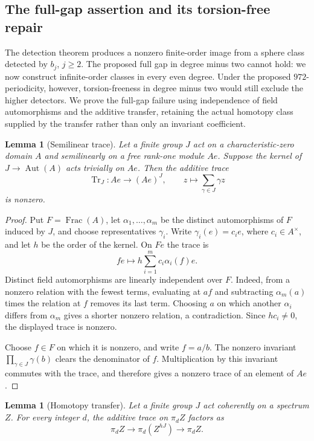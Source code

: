 \documentclass[11pt]{article}
\newtheorem{lemma}[theorem]{Lemma}
\theoremstyle{definition}
\theoremstyle{remark}
\numberwithin{equation}{section}
\begin{document}
\subsection{The full-gap assertion and its torsion-free repair}

The detection theorem produces a nonzero finite-order image from a
sphere class detected by \(b_j\), \(j\geq2\).  The proposed full gap
in degree minus two cannot hold: we now construct infinite-order
classes in every even degree.  Under the proposed \(972\)-periodicity,
however, torsion-freeness in degree minus two would still exclude the
higher detectors.  We prove the full-gap failure using independence
of field automorphisms and the additive transfer, retaining the actual
homotopy class supplied by the transfer rather than only an invariant
coefficient.

\begin{lemma}[Semilinear trace]\label{det:semilinear-trace}
Let a finite group \(J\) act on a characteristic-zero domain \(A\)
and semilinearly on a free rank-one module \(Ae\).
Suppose the kernel of \(J\to\operatorname{Aut}(A)\) acts trivially on \(Ae\).
Then the additive trace
\[
 \operatorname{Tr}_J:Ae\longrightarrow (Ae)^J,\qquad
 z\longmapsto\sum_{\gamma\in J}\gamma z
\]
is nonzero.
\end{lemma}

\begin{proof}
Put \(F=\operatorname{Frac}(A)\), let
\(\alpha_1,\ldots,\alpha_m\) be the distinct automorphisms of \(F\)
induced by \(J\), and choose representatives \(\gamma_i\).
Write \(\gamma_i(e)=c_i e\), where \(c_i\in A^\times\), and let
\(h\) be the order of the kernel.  On \(Fe\) the trace is
\[
 fe\longmapsto
 h\sum_{i=1}^m c_i\alpha_i(f)e .
\]
Distinct field automorphisms are linearly independent over \(F\).
Indeed, from a nonzero relation with the fewest terms, evaluating at
\(af\) and subtracting \(\alpha_m(a)\) times the relation at \(f\)
removes its last term.  Choosing \(a\) on which another
\(\alpha_i\) differs from \(\alpha_m\) gives a shorter nonzero
relation, a contradiction.
Since \(hc_i\ne0\), the displayed trace is nonzero.

Choose \(f\in F\) on which it is nonzero, and write \(f=a/b\).
The nonzero invariant
\(\prod_{\gamma\in J}\gamma(b)\) clears the denominator of \(f\).
Multiplication by this invariant commutes with the trace, and
therefore gives a nonzero trace of an element of \(Ae\).
\end{proof}

\begin{lemma}[Homotopy transfer]\label{det:homotopy-transfer}
Let a finite group \(J\) act coherently on a spectrum \(Z\).
For every integer \(d\), the additive trace on \(\pi_d Z\)
factors as
\[
 \pi_d Z\longrightarrow \pi_d(Z^{hJ})
       \longrightarrow \pi_d Z .
\]
\end{lemma}
\end{document}
